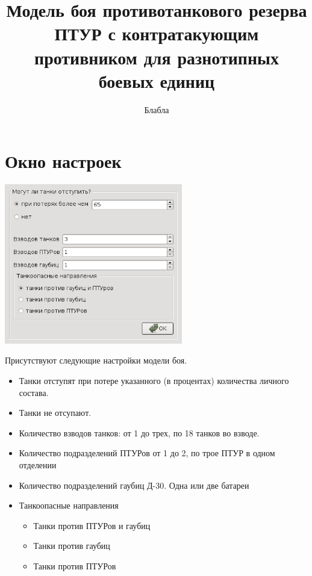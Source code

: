 \documentclass{cw1}
\begin{document}
\sloppy

\title{Модель боя противотанкового резерва ПТУР с контратакующим противником
для разнотипных боевых единиц}

\author{Блабла}

\maketitle
\setcounter{page}{2}

\section{Окно настроек}
\begin{center}
\includegraphics[height=70mm]{img1.png}
\end{center}
Присутствуют следующие настройки модели боя.
\begin{itemize}
 \item Танки отступят при потере указанного (в процентах) количества личного состава.
 \item Танки не отсупают.
 \item Количество взводов танков: от 1 до трех, по 18 танков во взводе.
 \item Количество подразделений ПТУРов от 1 до 2, по трое ПТУР в одном отделении
 \item Количество подразделений гаубиц Д-30. Одна или две батареи
 \item Танкоопасные направления
   \begin{itemize}
    \item Танки против ПТУРов и гаубиц
    \item Танки против гаубиц
    \item Танки против ПТУРов
   \end{itemize}
\end{itemize}
\end{document}
